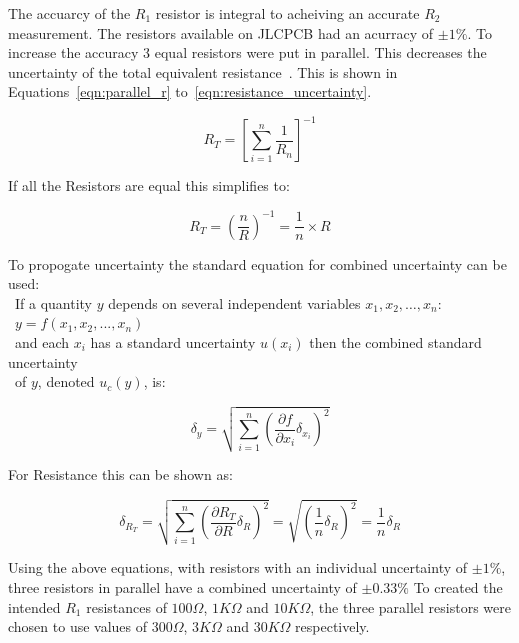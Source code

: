 The accuarcy of the $R_1$ resistor is integral to acheiving an accurate $R_2$ measurement.
The resistors available on JLCPCB had an acurracy of $\pm{1}\%$.
To increase the accuracy 3 equal resistors were put in parallel. This decreases the uncertainty of the total equivalent resistance~\cite{cam_clark}.
This is shown in Equations~\ref{eqn:parallel_r} to~\ref{eqn:resistance_uncertainty}.

\begin{equation}\label{eqn:parallel_r}
    R_{T} = {\left[{\sum_{i=1}^{n}{\frac{1}{R_n}}}\right]}^{-1}
\end{equation}

If all the Resistors are equal this simplifies to: 

\begin{equation}\label{eqn:parallel_r_equal}
    R_{T} = ({\frac{n}{R}})^{-1} = \frac{1}{n} \times R
\end{equation}

To propogate uncertainty the standard equation for combined uncertainty can be used: \\
\hspace*{2em}~If a quantity $y$ depends on several independent variables $x_1, x_2, \ldots, x_n$: \\
\hspace*{2em}~$y=f(x_1, x_2, ..., x_n)$ \\
\hspace*{2em}~and each $x_i$ has a standard uncertainty $u(x_i)$ then the combined standard uncertainty \\
\hspace*{2em}~of $y$, denoted $u_c(y)$, is:

\begin{equation}\label{eqn:standard_uncertainty}
    \delta_y=\sqrt{\sum_{i=1}^{n}{\left({{\frac{\partial{f}}{\partial{x_i}}}{\delta_{x_i}}}\right)}^2}
\end{equation}

For Resistance this can be shown as:

\begin{equation}\label{eqn:resistance_uncertainty}
    \delta_{R_T}=\sqrt{\sum_{i=1}^{n}{\left({{\frac{\partial{R_{T}}}{\partial{R}}}{\delta_{R}}}\right)}^2} = \sqrt{{\left({{\frac{1}{n}}\delta_R}\right)}^2} = \frac{1}{n}\delta_R
\end{equation}

Using the above equations, with resistors with an individual uncertainty of $\pm1\%$, three resistors in parallel have a combined uncertainty of $\pm0.33\%$
To created the intended $R_1$ resistances of $100\Omega$, $1K\Omega$ and $10K\Omega$, the three parallel resistors were chosen to use values of $300\Omega$, $3K\Omega$ and $30K\Omega$ respectively.

